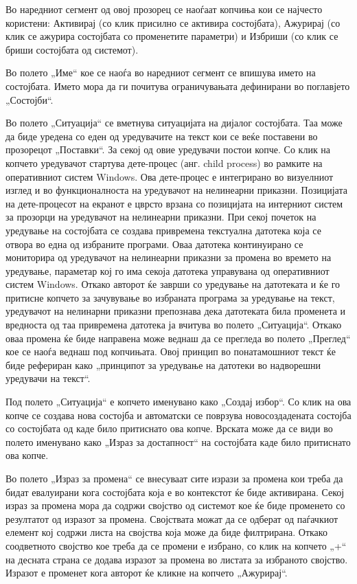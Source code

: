 Во наредниот сегмент од овој прозорец се наоѓаат копчиња кои се најчесто користени: Активирај (со клик присилно се активира состојбата), Ажурирај (со клик се ажурира состојбата со променетите параметри) и Избриши (со клик се бриши состојбата од системот).

Во полето „Име“ кое се наоѓа во наредниот сегмент се впишува името на состојбата. Името мора да ги почитува ограничувањата дефинирани во поглавјето „Состојби“.

Во полето „Ситуација“ се вметнува ситуацијата на дијалог состојбата. Таа може да биде уредена со еден од уредувачите на текст кои се веќе поставени во прозорецот „Поставки“. За секој од овие уредувачи постои копче. Со клик на копчето уредувачот стартува дете-процес (анг. child process) во рамките на оперативниот систем Windows. Ова дете-процес е интегрирано во визуелниот изглед и во функционалноста на уредувачот на нелинеарни приказни. Позицијата на дете-процесот на екранот е цврсто врзана со позицијата на интерниот систем за прозорци на уредувачот на нелинеарни приказни. При секој почеток на уредување на состојбата се создава привремена текстуална датотека која се отвора во една од избраните програми. Оваа датотека континуирано се мониторира од уредувачот на нелинеарни приказни за промена во времето на уредување, параметар кој го има секоја датотека управувана од оперативниот систем Windows. Откако авторот ќе заврши со уредување на датотеката и ќе го притисне копчето за зачувување во избраната програма за уредување на текст, уредувачот на нелинарни приказни препознава дека датотеката била променета и вредноста од таа привремена датотека ја вчитува во полето „Ситуација“. Откако оваа промена ќе биде направена може веднаш да се прегледа во полето „Преглед“ кое се наоѓа веднаш под копчињата. Овој принцип во понатамошниот текст ќе биде рефериран како „принципот за уредување на датотеки во надворешни уредувачи на текст“.

Под полето „Ситуација“ е копчето именувано како „Создај избор“. Со клик на ова копче се создава нова состојба и автоматски се поврзува новосоздадената состојба со состојбата од каде било притиснато ова копче. Врската може да се види во полето именувано како „Израз за достапност“ на состојбата каде било притиснато ова копче.

Во полето „Израз за промена“ се внесуваат сите изрази за промена кои треба да бидат евалуирани кога состојбата која е во контекстот ќе биде активирана. Секој израз за промена мора да содржи својство од системот кое ќе биде променето со резултатот од изразот за промена. Својствата можат да се одберат од паѓачкиот елемент кој содржи листа на својства која може да биде филтрирана. Откако соодветното својство кое треба да се промени е избрано, со клик на копчето „+“ на десната страна се додава изразот за промена во листата за избраното својство. Изразот е променет кога авторот ќе кликне на копчето „Ажурирај“.

